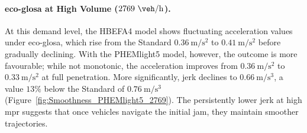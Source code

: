 \paragraph{\ac{eco-glosa} at High Volume ($2769~\unit{\veh\per\hour}$).}
At this demand level, the HBEFA4 model shows fluctuating acceleration values under \ac{eco-glosa}, which rise from the Standard $0.36~\unit{\metre\per\second\squared}$ to $0.41~\unit{\metre\per\second\squared}$ before gradually declining. With the PHEMlight5 model, however, the outcome is more favourable; while not monotonic, the acceleration improves from $0.36~\unit{\metre\per\second\squared}$ to $0.33~\unit{\metre\per\second\squared}$ at full penetration. More significantly, jerk declines to $0.66~\unit{\metre\per\second\cubed}$, a value $13\%$ below the Standard of $0.76~\unit{\metre\per\second\cubed}$ (Figure~\vref{fig:Smoothness_PHEMlight5_2769}). The persistently lower jerk at high \ac{mpr} suggests that once vehicles navigate the initial jam, they maintain smoother trajectories.

